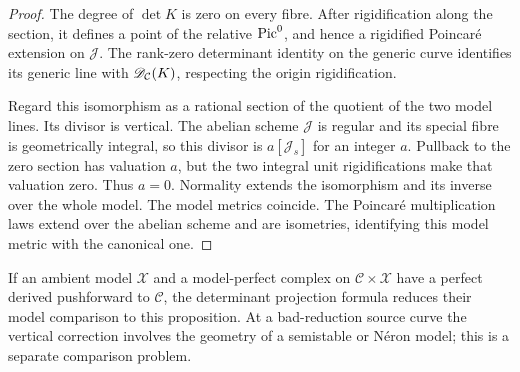 
\begin{proof}
The degree of \(\det K\) is zero on every fibre. After
rigidification along the section, it defines a point of the
relative \(\operatorname{Pic}^0\), and hence a rigidified Poincaré extension
on \(\mathcal J\). The rank-zero determinant identity on the
generic curve identifies its generic line with
\(\mathscr D_{\mathcal C}(K)\), respecting the origin rigidification.

Regard this isomorphism as a rational section of the quotient of
the two model lines. Its divisor is vertical. The abelian scheme
\(\mathcal J\) is regular and its special fibre is geometrically
integral, so this divisor is \(a[\mathcal J_s]\) for an integer
\(a\). Pullback to the zero section has valuation \(a\), but
the two integral unit rigidifications make that valuation zero.
Thus \(a=0\). Normality extends the isomorphism and its inverse
over the whole model. The model metrics coincide. The Poincaré
multiplication laws extend over the abelian scheme and are
isometries, identifying this model metric with the canonical one.
\end{proof}

If an ambient model \(\mathcal X\) and a model-perfect complex
on \(\mathcal C\times\mathcal X\) have a perfect derived
pushforward to \(\mathcal C\), the determinant projection
formula reduces their model comparison to this proposition.
At a bad-reduction source curve the vertical correction involves
the geometry of a semistable or Néron model; this is a separate
comparison problem.
